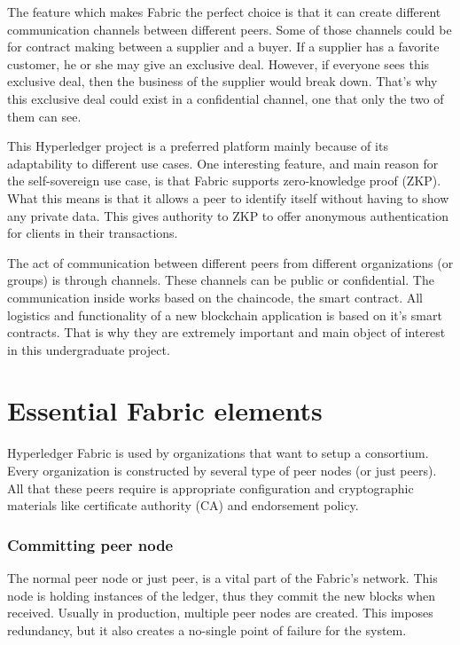 \documentclass[a4paper,11pt]{report}
\begin{document}
The feature which makes Fabric the perfect choice is that it can create different communication channels between different peers. Some of those channels could be for contract making between a supplier and a buyer. If a supplier has a favorite customer, he or she may give an exclusive deal. However, if everyone sees this exclusive deal, then the business of the supplier would break down. That's why this exclusive deal could exist in a confidential channel, one that only the two of them can see. 

	This Hyperledger project is a preferred platform mainly because of its adaptability to different use cases. One interesting feature, and main reason for the self-sovereign use case, is that Fabric supports zero-knowledge proof (ZKP). What this means is that it allows a peer to identify itself without having to show any private data. This gives authority to ZKP to offer anonymous authentication for clients in their transactions. \cite{li2018fppb}
	
	The act of communication between different peers from different organizations (or groups) is through channels. These channels can be public or confidential. The communication inside works based on the chaincode, the smart contract. All logistics and functionality of a new blockchain application is based on it’s smart contracts. That is why they are extremely important and main object of interest in this undergraduate project.
	
	
\section{Essential Fabric elements}
\label{felements}
Hyperledger Fabric is used by organizations that want to setup a consortium. Every organization is constructed by several type of peer nodes (or just peers). All that these peers require is appropriate configuration and cryptographic materials like certificate authority (CA) and endorsement policy.
\subsubsection{Committing peer node}
The normal peer node or just peer, is a vital part of the Fabric’s network. This node is holding instances of the ledger, thus they commit the new blocks when received. Usually in production, multiple peer nodes are created. This imposes redundancy, but it also creates a no-single point of failure for the system. 
\end{document}
